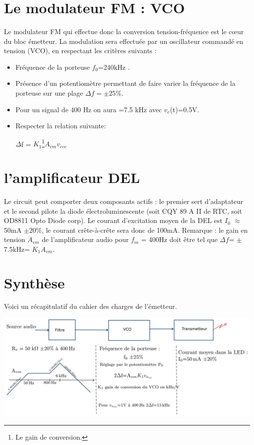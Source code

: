 \documentclass[a4paper]{report}
\begin{document}
\section{Le modulateur FM : VCO}
\paragraph{}
Le modulateur FM qui effectue donc la conversion tension-fréquence est le cœur du bloc émetteur. La modulation sera effectuée par un oscillateur commandé en tension (VCO), en respectant les critères suivants :
\begin{itemize}
\item Fréquence de la porteuse $f_0$=240kHz .
\item Présence d’un potentiomètre permettant de faire varier la fréquence de la porteuse sur une plage $\Delta f=\pm 25 \%$.
\item Pour un signal de 400 Hz on aura =7.5 kHz avec $v_e$(t)=0.5V.
\item Respecter la relation suivante:
\begin{center}
$\Delta$f = $K_1$\footnote{Le gain de conversion.}$A_{vm}$$v_{ecc}$
\end{center}
\end{itemize}


\section{l'amplificateur DEL}
\paragraph{}
Le circuit peut comporter deux composants actifs : le premier sert d'adaptateur et le second pilote la diode électroluminescente (soit CQY 89 A II de RTC, soit OD8811 Opto Diode corp). Le courant d'excitation moyen de la DEL est $I_0$ $\approx$ 50mA $\pm$20$\%$, le courant crête-à-crête sera donc de 100mA.
%
Remarque :  le gain en tension $A_{vm}$ de l'amplificateur audio pour $f_m$ = 400Hz doit être tel que $\Delta f$= $\pm$7.5kHz= $K_1A_{vm}$.


\newpage
\section{Synthèse}

Voici un récapitulatif du cahier des charges de l'émetteur.\\
\begin{center}
\includegraphics[width=1\textwidth]{resume.PNG}
\end{center}
\end{document}
